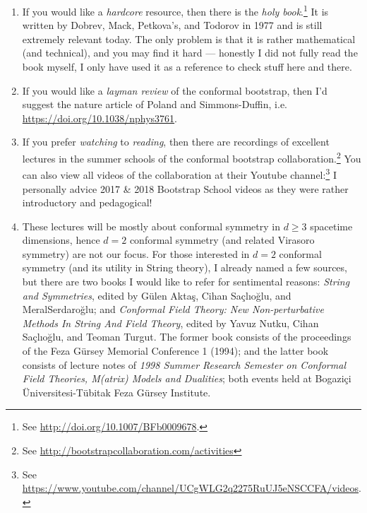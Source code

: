 \documentclass[12pt]{article}
\numberwithin{equation}{section}
\begin{document}
\begin{enumerate}
	\item If you would like a \emph{hardcore} resource, then there is the \emph{holy book}.\footnote{See \hyperref{http://doi.org/10.1007/BFb0009678}{}{}{http://doi.org/10.1007/BFb0009678}.} It is written by Dobrev, Mack, Petkova's, and Todorov in 1977 and is still extremely relevant today. The only problem is that it is rather mathematical (and technical), and you may find it hard --- honestly I did not fully read the book myself, I only have used it as a reference to check stuff here and there. 
	\item If you would like a \emph{layman review} of the conformal bootstrap, then I'd suggest the nature article of Poland and Simmons-Duffin, i.e. \hyperref{https://doi.org/10.1038/nphys3761}{}{}{https://doi.org/10.1038/nphys3761}.
	
	\item If you prefer \emph{watching} to \emph{reading}, then there are recordings of excellent lectures in the summer schools of the conformal bootstrap collaboration.\footnote{See \hyperref{http://bootstrapcollaboration.com/activities}{}{}{http://bootstrapcollaboration.com/activities}} You can also view all videos of the collaboration at their Youtube channel:\footnote{See \hyperref{https://www.youtube.com/channel/UCgWLG2q2275RuUJ5eNSCCFA/videos}{}{}{https://www.youtube.com/channel/UCgWLG2q2275RuUJ5eNSCCFA/videos}.} I personally advice 2017 \& 2018 Bootstrap School videos as they were rather introductory and pedagogical!
	
	\item These lectures will be mostly about conformal symmetry in $d\ge 3$ spacetime dimensions, hence $d=2$ conformal symmetry (and related Virasoro symmetry) are not our focus. For those interested in $d=2$ conformal symmetry (and its utility in String theory), I already named a few sources, but there are two books I would like to refer for sentimental reasons:  \emph{String and Symmetries}, edited by Gülen Aktaş, Cihan Saçlıoğlu, and MeralSerdaroğlu; and \emph{Conformal Field Theory: New Non-perturbative Methods In String And Field Theory}, edited by Yavuz Nutku, Cihan Saçlıoğlu, and Teoman Turgut. The former book consists of the proceedings of the Feza Gürsey Memorial Conference 1 (1994); and the latter book consists of lecture notes of  \emph{1998 Summer Research Semester on Conformal Field Theories, M(atrix) Models and Dualities}; both events held at Bogaziçi Üniversitesi-Tübitak Feza Gürsey Institute.
	

\end{enumerate}
\end{document}
